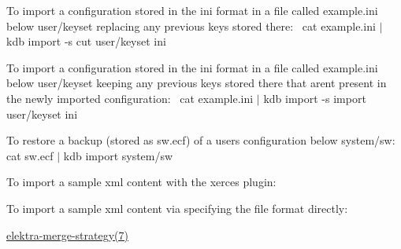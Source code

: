 To import a configuration stored in the {\ttfamily ini} format in a file called {\ttfamily example.\+ini} below {\ttfamily user/keyset} replacing any previous keys stored there\+:~\newline
 {\ttfamily cat example.\+ini $\vert$ kdb import -\/s cut user/keyset ini}

To import a configuration stored in the {\ttfamily ini} format in a file called {\ttfamily example.\+ini} below {\ttfamily user/keyset} keeping any previous keys stored there that aren\textquotesingle{}t present in the newly imported configuration\+:~\newline
 {\ttfamily cat example.\+ini $\vert$ kdb import -\/s import user/keyset ini}

To restore a backup (stored as {\ttfamily sw.\+ecf}) of a user\textquotesingle{}s configuration below {\ttfamily system/sw}\+:~\newline
 {\ttfamily cat sw.\+ecf $\vert$ kdb import system/sw}

To import a sample {\ttfamily xml} content with the {\ttfamily xerces} plugin\+:


\begin{DoxyCode}{0}
\DoxyCodeLine{}
\end{DoxyCode}


To import a sample {\ttfamily xml} content via specifying the file format directly\+:


\begin{DoxyCode}{0}
\DoxyCodeLine{}
\DoxyCodeLine{}
\end{DoxyCode}



\begin{DoxyItemize}
\item \mbox{\hyperlink{doc_help_elektra-merge-strategy_md}{elektra-\/merge-\/strategy(7)}} 
\end{DoxyItemize}